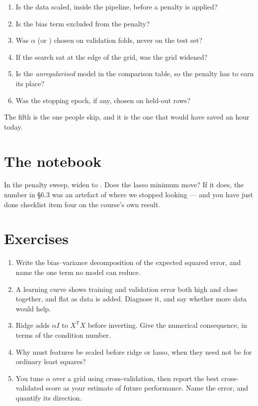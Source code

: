 \documentclass[11pt,a4paper]{article}
\begin{document}
\begin{keybox}[title={Regularisation checklist}]
\begin{enumerate}[leftmargin=1.6em,itemsep=1pt]
  \item Is the data scaled, inside the pipeline, before a penalty is applied?
  \item Is the bias term excluded from the penalty?
  \item Was $\alpha$ (or ) chosen on validation folds, never on the
        test set?
  \item If the search sat at the edge of the grid, was the grid widened?
  \item Is the \emph{unregularised} model in the comparison table, so the
        penalty has to earn its place?
  \item Was the stopping epoch, if any, chosen on held-out rows?
\end{enumerate}
The fifth is the one people skip, and it is the one that would have saved an
hour today.
\end{keybox}

\section{The notebook}

\begin{trybox}[title={What to change}]
In the penalty sweep, widen  to
. Does the lasso minimum move? If it does, the number in
\S6.3 was an artefact of where we stopped looking --- and you have just done
checklist item four on the course's own result.
\end{trybox}

\section{Exercises}

\begin{enumerate}[leftmargin=1.6em,itemsep=4pt]
  \item Write the bias--variance decomposition of the expected squared error,
        and name the one term no model can reduce. \hfill \scope{[4]}
  \item A learning curve shows training and validation error both high and
        close together, and flat as data is added. Diagnose it, and say whether
        more data would help. \hfill \scope{[5]}
  \item Ridge adds $\alpha I$ to $X^{\mathsf T}X$ before inverting. Give the
        numerical consequence, in terms of the condition number.
        \hfill \scope{[4]}
  \item Why must features be scaled before ridge or lasso, when they need not
        be for ordinary least squares? \hfill \scope{[4]}
  \item You tune $\alpha$ over a grid using cross-validation, then report the
        best cross-validated score as your estimate of future performance. Name
        the error, and quantify its direction. \hfill \scope{[5]}
\end{enumerate}
\end{document}
